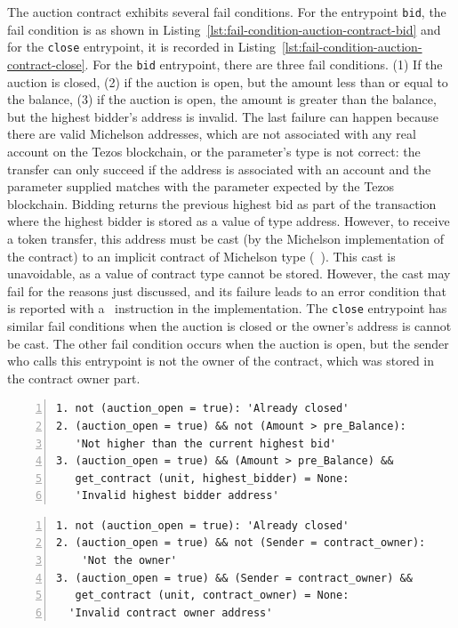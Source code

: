 \documentclass[a4paper,USenglish,cleveref, autoref,anonymous]{lipics-v2021}
\begin{document}
The auction contract exhibits several fail conditions. For the
entrypoint \lstinline/bid/, the fail condition is as shown in
Listing~\ref{lst:fail-condition-auction-contract-bid} and for the
\lstinline/close/ entrypoint, it is recorded in
Listing~\ref{lst:fail-condition-auction-contract-close}. For the
\lstinline/bid/ entrypoint, there are three fail conditions.  (1) If
the auction is closed, (2) if the auction is open, but the amount less
than or equal to the balance, (3) if the auction is open, the amount
is greater than the balance, but the highest bidder's address is
invalid. The last failure can happen because there are valid Michelson
addresses, which are not associated with any real account on the Tezos
blockchain, or the parameter's type is not correct: the transfer can
only succeed if the address is associated with an account and the
parameter supplied matches with the parameter expected by the Tezos
blockchain. Bidding returns the previous highest bid as part of the
transaction where the highest bidder is stored as a value of type
address. However, to receive a token transfer, this address must be
cast (by the Michelson implementation of the contract) to an implicit
contract of Michelson type (\TCONTRACT\ \TUNIT). This cast is
unavoidable, as a value of contract type cannot be stored.  However,
the cast may fail for the reasons just discussed, and its failure
leads to an error condition that is reported with a \FAILWITH\
instruction in the implementation. The \lstinline/close/ entrypoint has
similar fail conditions when the auction is closed or the owner's
address is cannot be cast. The other fail condition occurs when the
auction is open, but the sender who calls this entrypoint is not the
owner of the contract, which was stored in the contract owner part.

\begin{lstlisting}[float=tp,captionpos=b,caption={Fail condition for auction contract bid entrypoint },label={lst:fail-condition-auction-contract-bid},numbers=left]
1. not (auction_open = true): 'Already closed'
2. (auction_open = true) && not (Amount > pre_Balance):
   'Not higher than the current highest bid'
3. (auction_open = true) && (Amount > pre_Balance) && 
   get_contract (unit, highest_bidder) = None:
   'Invalid highest bidder address' 
\end{lstlisting}

\begin{lstlisting}[float=tp,captionpos=b,caption={Fail condition for auction contract close entrypoint},label={lst:fail-condition-auction-contract-close},numbers=left]
1. not (auction_open = true): 'Already closed'
2. (auction_open = true) && not (Sender = contract_owner): 
    'Not the owner'
3. (auction_open = true) && (Sender = contract_owner) &&
   get_contract (unit, contract_owner) = None:
  'Invalid contract owner address'
\end{lstlisting}
\end{document}
